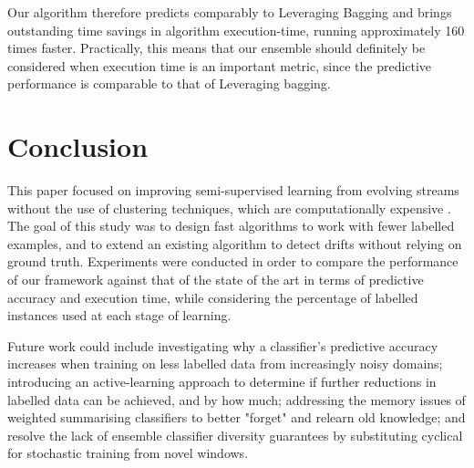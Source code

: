 \documentclass[runningheads]{llncs}
\begin{document}
Our algorithm therefore predicts comparably to Leveraging Bagging and brings outstanding time savings in algorithm execution-time, running approximately 160 times faster. Practically, this means that our ensemble should definitely be considered when execution time is an important metric, since the predictive performance is comparable to that of Leveraging bagging.

\section{Conclusion\label{section:conclusion}}
This paper focused on improving semi-supervised learning from evolving streams without the use of clustering techniques, which are computationally expensive \cite{krempl2014open}. The goal of this study was to design fast algorithms to work with fewer labelled examples, and to extend an existing algorithm to detect drifts without relying on ground truth. Experiments were conducted in order to compare the performance of our framework against that of the state of the art in terms of predictive accuracy and execution time, while considering the percentage of labelled instances used at each stage of learning. 

Future work could include investigating why a classifier's predictive accuracy increases when training on less labelled data from increasingly noisy domains; introducing an active-learning approach to determine if further reductions in labelled data can be achieved, and by how much; addressing the memory issues of weighted summarising classifiers to better "forget" and relearn old knowledge; and resolve the lack of ensemble classifier diversity guarantees by substituting cyclical for stochastic training from novel windows.

\printbibliography
\end{document}
